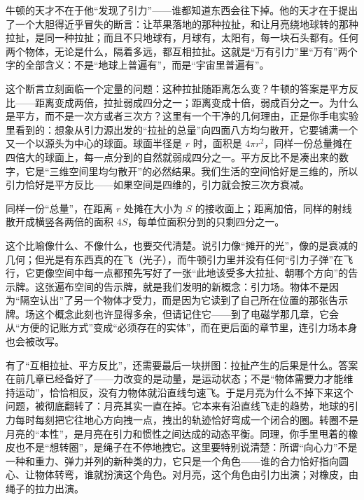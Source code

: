牛顿的天才不在于他“发现了引力”——谁都知道东西会往下掉。他的天才在于提出了一个大胆得近乎冒失的断言：让苹果落地的那种拉扯，和让月亮绕地球转的那种拉扯，是同一种拉扯；而且不只地球有，月球有，太阳有，每一块石头都有。任何两个物体，无论是什么，隔着多远，都互相拉扯。这就是“万有引力”里“万有”两个字的全部含义：不是“地球上普遍有”，而是“宇宙里普遍有”。

这个断言立刻面临一个定量的问题：这种拉扯随距离怎么变？牛顿的答案是平方反比——距离变成两倍，拉扯弱成四分之一；距离变成十倍，弱成百分之一。为什么是平方，而不是一次方或者三次方？这里有一个干净的几何理由，正是你手电实验里看到的：想象从引力源出发的“拉扯的总量”向四面八方均匀散开，它要铺满一个又一个以源头为中心的球面。球面半径是 \(r\) 时，面积是 \(4\pi r^{2}\)，同样一份总量摊在四倍大的球面上，每一点分到的自然就弱成四分之一。平方反比不是凑出来的数字，它是“三维空间里均匀散开”的必然结果。我们生活的空间恰好是三维的，所以引力恰好是平方反比——如果空间是四维的，引力就会按三次方衰减。

\begin{center}
\end{center}

同样一份“总量”，在距离 \(r\) 处摊在大小为 \(S\) 的接收面上；距离加倍，同样的射线散开成横竖各两倍的面积 \(4S\)，每单位面积分到的只剩四分之一。

这个比喻像什么、不像什么，也要交代清楚。说引力像“摊开的光”，像的是衰减的几何；但光是有东西真的在飞（光子），而牛顿引力里并没有任何“引力子弹”在飞行，它更像空间中每一点都预先写好了一张“此地该受多大拉扯、朝哪个方向”的告示牌。这张遍布空间的告示牌，就是我们发明的新概念：引力场。物体不是因为“隔空认出”了另一个物体才受力，而是因为它读到了自己所在位置的那张告示牌。场这个概念此刻也许显得多余，但请记住它——到了电磁学那几章，它会从“方便的记账方式”变成“必须存在的实体”，而在更后面的章节里，连引力场本身也会被改写。

有了“互相拉扯、平方反比”，还需要最后一块拼图：拉扯产生的后果是什么。答案在前几章已经备好了——力改变的是动量，是运动状态；不是“物体需要力才能维持运动”，恰恰相反，没有力物体就沿直线匀速飞。于是月亮为什么不掉下来这个问题，被彻底翻转了：月亮其实一直在掉。它本来有沿直线飞走的趋势，地球的引力每时每刻把它往地心方向拽一点，拽出的轨迹恰好弯成一个闭合的圈。转圈不是月亮的“本性”，是月亮在引力和惯性之间达成的动态平衡。同理，你手里甩着的橡皮也不是“想转圈”，是绳子在不停地拽它。这里要特别说清楚：所谓“向心力”不是一种和重力、弹力并列的新种类的力，它只是一个角色——谁的合力恰好指向圆心、让物体转弯，谁就扮演这个角色。对月亮，这个角色由引力出演；对橡皮，由绳子的拉力出演。


